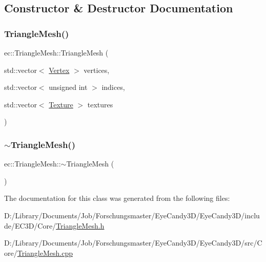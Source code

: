 \subsection{Constructor \& Destructor Documentation}
\mbox{\label{classec_1_1_triangle_mesh_aac37d81b92c1140706179fe062ca8342}} 
\subsubsection{\texorpdfstring{Triangle\+Mesh()}{TriangleMesh()}}
{\footnotesize\ttfamily ec\+::\+Triangle\+Mesh\+::\+Triangle\+Mesh (\begin{DoxyParamCaption}\item[{std\+::vector$<$ \mbox{\hyperlink{structec_1_1_vertex}{Vertex}} $>$}]{vertices,  }\item[{std\+::vector$<$ unsigned int $>$}]{indices,  }\item[{std\+::vector$<$ \mbox{\hyperlink{classec_1_1_texture}{Texture}} $>$}]{textures }\end{DoxyParamCaption})\hspace{0.3cm}{\ttfamily [explicit]}}

\mbox{\label{classec_1_1_triangle_mesh_a4b22f588bc354df2b6f7357993f44193}} 
\subsubsection{\texorpdfstring{$\sim$\+Triangle\+Mesh()}{~TriangleMesh()}}
{\footnotesize\ttfamily ec\+::\+Triangle\+Mesh\+::$\sim$\+Triangle\+Mesh (\begin{DoxyParamCaption}{ }\end{DoxyParamCaption})}



The documentation for this class was generated from the following files\+:\begin{DoxyCompactItemize}
\item 
D\+:/\+Library/\+Documents/\+Job/\+Forschungsmaster/\+Eye\+Candy3\+D/\+Eye\+Candy3\+D/include/\+E\+C3\+D/\+Core/\mbox{\hyperlink{_triangle_mesh_8h}{Triangle\+Mesh.\+h}}\item 
D\+:/\+Library/\+Documents/\+Job/\+Forschungsmaster/\+Eye\+Candy3\+D/\+Eye\+Candy3\+D/src/\+Core/\mbox{\hyperlink{_triangle_mesh_8cpp}{Triangle\+Mesh.\+cpp}}\end{DoxyCompactItemize}
